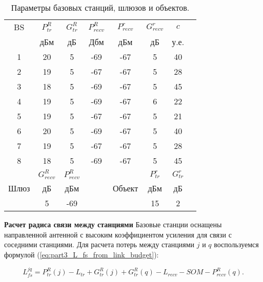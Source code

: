 \begin{table}[b]\centering
  \begin{tabular}{|c||c|c|c|c|c|c|c|}\hline
    BS & $P_{tr}^R$ &  $G_{tr}^R$ & $P_{recv}^R$ & $P_{recv}^r$ & $G_{recv}^r$ & $c$ \\ \cline{2-1} \cline{3-1} \cline{4-1} \cline{5-1}  \cline{6-1} \cline{7-1}
     & дБм & дБ & Дбм & дБм & дБ & у.е.  \\ \hline
    1 & 20 & 5 & -69 & -67 & 5 & 40 \\ 

    2 & 19 & 5 & -67 & -67 & 5 & 28 \\ 

    3 & 18 & 5 & -69 & -67 & 5 & 45 \\ 

    4 & 19 & 5 & -69 & -67 & 6 & 22 \\ 

    5 & 19 & 5 & -67 & -67 & 5 & 21 \\ 

    6 & 20 & 5 & -69 & -67 & 5 & 40 \\ 

    7 & 19 & 5 & -67 & -67 & 5 & 28 \\

    8 & 18 & 5 & -69 & -67 & 5 & 45 \\ \hline \hline  

    &  $G_{recv}^R$ & $P_{recv}^R$ &  & & $P_{tr}^r$ & $G_{tr}^r$ \\  \cline{2-1} \cline{3-1} \cline{6-1} \cline{7-1} 

    Шлюз& дБ & дБм & & Объект & дБм & дБ  \\  \cline{2-1} \cline{3-1}  \cline{6-1} \cline{7-1}

    &  5 & -69 & &  & 15 & 2  \\ \hline

  \end{tabular}\caption{Параметры базовых станций, шлюзов и объектов.}\label{tab:part3_BS} 
\end{table}

\textbf{Расчет радиса связи между станциями}
Базовые станции оснащены направленной антенной с высоким коэффициентом усиления для связи с соседними станциями.
Для расчета потерь между станциями $j$ и $q$ воспользуемся формулой (\ref{eq:part3_L_fs_from_link_budget}):

\begin{displaymath}
  L_{fs}^{jq} = P_{tr}^R(j) - L_{tr} + G_{tr}^R(j) + G_{tr}^R(q) - L_{recv} - SOM - P_{recv}^R(q).
\end{displaymath}


